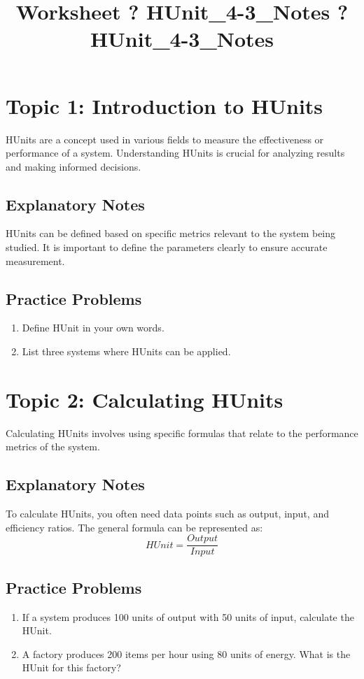 \documentclass{article}
\title{Worksheet ? HUnit\_4-3\_Notes ? HUnit\_4-3\_Notes}
\author{}
\date{}
\begin{document}
\maketitle

\section*{Topic 1: Introduction to HUnits}
HUnits are a concept used in various fields to measure the effectiveness or performance of a system. Understanding HUnits is crucial for analyzing results and making informed decisions.

\subsection*{Explanatory Notes}
HUnits can be defined based on specific metrics relevant to the system being studied. It is important to define the parameters clearly to ensure accurate measurement.

\subsection*{Practice Problems}
\begin{enumerate}[label=\arabic*.]
    \item Define HUnit in your own words.
    \item List three systems where HUnits can be applied.
\end{enumerate}

\section*{Topic 2: Calculating HUnits}
Calculating HUnits involves using specific formulas that relate to the performance metrics of the system.

\subsection*{Explanatory Notes}
To calculate HUnits, you often need data points such as output, input, and efficiency ratios. The general formula can be represented as:
\[
HUnit = \frac{Output}{Input}
\]

\subsection*{Practice Problems}
\begin{enumerate}[label=\arabic*.]
    \item If a system produces 100 units of output with 50 units of input, calculate the HUnit.
    \item A factory produces 200 items per hour using 80 units of energy. What is the HUnit for this factory?
\end{enumerate}
\end{document}
